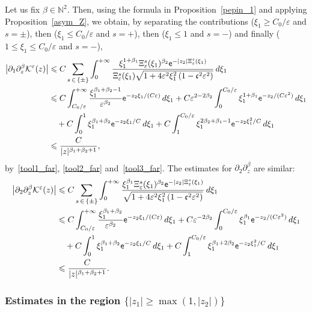 \documentclass[10pt]{amsart}
\theoremstyle{definition}\newtheorem{defi}[theo]{Definition}\newtheorem{rema}[theo]{Remark}\newtheorem{exam}[theo]{Example}\newtheorem{exem}[theo]{Example}\newtheorem{nota}[theo]{Notation}
\newcommand*\p{\partial}
\newcommand*\N{\mathbb N}
\newcommand*\BK{\mathcal{K}}
\newcommand*\ex{{\sf e}}
\newcommand*\cs{{\mathfrak c}}
\newcommand*\ii{\infty}
\newcommand*\gs{\geqslant }
\newcommand*\ls{\leqslant }
\newcommand*\e{\varepsilon}
\begin{document}
Let us fix $ \beta \in \N^2 $. Then, using the formula in Proposition~\ref{pepin_1} and applying Proposition~\ref{asym_Z}, we obtain, by separating the contributions ($ \xi_1 \gs C_0 /\e $ and $s = \pm $), then ($ \xi_1 \ls C_0 /\e $ and $s = + $), then ($ \xi_1 \ls 1 $ and $s = - $) and finally ($ 1 \ls \xi_1 \ls C_0 /\e $ and $s = - $),
\begin{align*}
\left\lvert \p_1 \p_z^\beta \BK^\e (z) \right\rvert & \ls C \sum_{s\,\in\,\{ \pm \} } \int_{0}^{+\ii}
\frac{ \xi_1^{1+\beta_1} \Xi_\e^s (\xi_1)^{\beta_2} \ex^{- |z_2| \Xi_\e^s (\xi_1)} }{\Xi_\e^s (\xi_1) \sqrt{1 + 4\e^2 \xi_1^2\left(1 - \cs^2 \e^2\right)}} \, d\xi_1
\\ &
\ls C \int_{ C_0 /\e }^{+\ii} \frac{\xi_1^{\beta_1 + \beta_2 -1}}{\e^{\beta_2} }\ex^{- z_2 \xi_1/ (C \e)} \, d\xi_1 + C \e^{2 -2 \beta_2} \int_0^{ C_0 / \e } \xi_1^{1+\beta_1} \ex^{- z_2 / (C \e^2) } \, d\xi_1
\\ & \quad + C \int_0^{1} \xi_1^{\beta_1 +\beta_2} \ex^{- z_2 \xi_1 / C } \, d\xi_1 + C \int_1^{ C_0 / \e} \xi_1^{2\beta_2 + \beta_1 -1} \ex^{- z_2 \xi_1^2 / C } \, d\xi_1
\\ &
\ls \frac{C}{|z|^{\beta_1+\beta_2 +1}},
\end{align*}
by~\eqref{tool1_far}, \eqref{tool2_far} and~\eqref{tool3_far}. The estimates for $ \p_2 \p_z^\beta $ are similar:
\begin{align*}
\left\lvert \p_2 \p_z^\beta \BK^\e (z) \right\rvert & \ls C \sum_{s\,\in\,\{ \pm \} } \int_{0}^{+\ii}
\frac{ \xi_1^{\beta_1} \Xi_\e^s (\xi_1)^{\beta_2} \ex^{- |z_2| \Xi_\e^s (\xi_1)} }{ \sqrt{1 + 4\e^2 \xi_1^2\left(1 - \cs^2 \e^2\right) } } \, d\xi_1
\\ &
\ls C \int_{ C_0 /\e }^{+\ii} \frac{ \xi_1^{\beta_1 + \beta_2 } }{ \e^{\beta_2 } }
\ex^{- z_2 \xi_1/ (C \e)} \, d\xi_1 + C \e^{ -2 \beta_2} \int_0^{ C_0 / \e } \xi_1^{\beta_1} \ex^{- z_2 / (C \e^2) } \, d\xi_1
\\ & \quad + C \int_0^{1} \xi_1^{\beta_1 +\beta_2} \ex^{- z_2 \xi_1 / C } \, d\xi_1 + C \int_1^{ C_0 / \e} \xi_1^{\beta_1 + 2\beta_2 } \ex^{- z_2 \xi_1^2 / C } \, d\xi_1
\\ &
\ls \frac{C}{|z|^{\beta_1+\beta_2 +1}}.
\end{align*}



\subsubsection{Estimates in the region \texorpdfstring{$\{ |z_1 | \gs \max(1, |z_2|) \} $}{{ |z1 | gs max(1, |z2|) } }}
\end{document}

